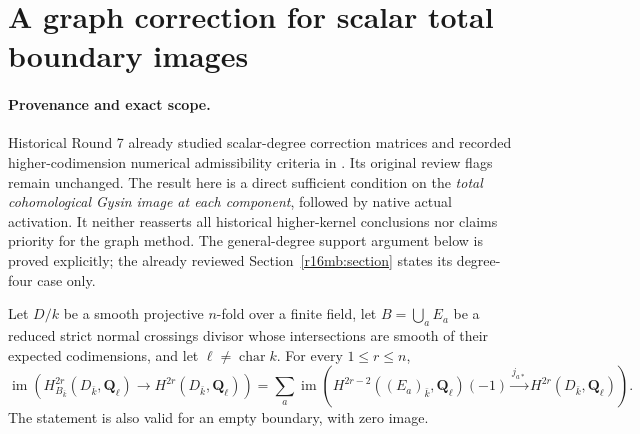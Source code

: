 \section{A graph correction for scalar total boundary images}
\label{r16gg:section}

\paragraph{Provenance and exact scope.}
Historical Round 7 already studied scalar-degree correction matrices
and recorded higher-codimension numerical admissibility criteria in
.
Its original review flags remain unchanged. The result here is a
direct sufficient condition on the \emph{total cohomological Gysin
image at each component}, followed by native actual activation.
It neither reasserts all historical higher-kernel conclusions nor
claims priority for the graph method. The general-degree support
argument below is proved explicitly; the already reviewed
Section~\ref{r16mb:section} states its degree-four case only.

\begin{lemma}
\label{r16gg:support}
Let $D/k$ be a smooth projective $n$-fold over a finite field,
let $B=\bigcup_a E_a$ be a reduced strict normal crossings divisor
whose intersections are smooth of their expected codimensions,
and let $\ell\ne\operatorname{char}k$. For every $1\leq r\leq n$,
\[
 \operatorname{im}\left(H^{2r}_{B_{\bar k}}(D_{\bar k},\mathbf Q_\ell)
                   \longrightarrow H^{2r}(D_{\bar k},\mathbf Q_\ell)\right)
 =\sum_a\operatorname{im}\left(
 H^{2r-2}((E_a)_{\bar k},\mathbf Q_\ell)(-1)
                  \xrightarrow{j_{a*}}H^{2r}(D_{\bar k},\mathbf Q_\ell)
                         \right).
 \tag{GG16.1}\label{r16gg:support-image}
\]
The statement is also valid for an empty boundary, with zero image.
\end{lemma}

